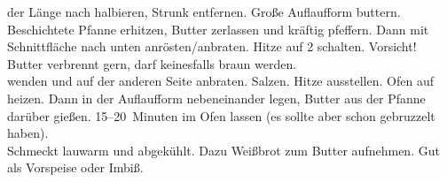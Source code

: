       \begin{zubereitung}
        \chicoree{} der Länge nach halbieren, Strunk entfernen. Große
	Auflaufform buttern. Beschichtete Pfanne erhitzen, Butter zerlassen
	und kräftig pfeffern. Dann \chicoree{} mit Schnittfläche nach unten
	anrösten/anbraten. Hitze auf \glqq{}2\grqq{} schalten. Vorsicht!
	Butter verbrennt gern, darf keinesfalls braun werden. \\
	\chicoree{} wenden und auf der anderen Seite anbraten. Salzen.
	Hitze ausstellen. Ofen auf  heizen. Dann \chicoree{} in der
	Auflaufform nebeneinander legen, Butter aus der Pfanne darüber gießen.
	15--20~Minuten im Ofen lassen (es sollte aber schon gebruzzelt haben).
	\\
	Schmeckt lauwarm und abgekühlt. Dazu Weißbrot zum Butter aufnehmen.
	Gut als Vorspeise oder Imbiß. \\
      \end{zubereitung}
